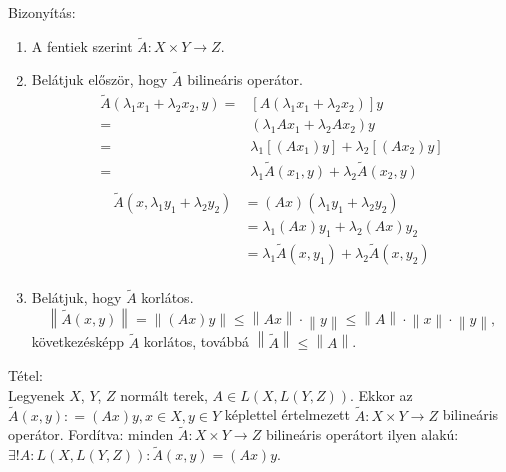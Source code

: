 \documentclass[12pt,a4paper]{scrartcl}
\providecommand{\tightlist}{%
  \setlength{\itemsep}{0pt}\setlength{\parskip}{0pt}}
\newenvironment{tetel}{}{}
\newenvironment{bizonyitas}{}{}
\begin{document}
\begin{bizonyitas}

Bizonyítás:

\begin{enumerate}
\def\labelenumi{\arabic{enumi}.}
\tightlist
\item
  A fentiek szerint
  \(\left. \widetilde{A}:X \times Y\rightarrow Z \right.\).
\item
  Belátjuk először, hogy \(\widetilde{A}\) bilineáris operátor.
  \[\begin{aligned}
    \tilde A\left( {{\lambda _1}{x_1} + {\lambda _2}{x_2},y} \right) =  & \left[ {A\left( {{\lambda _1}{x_1} + {\lambda _2}{x_2}} \right)} \right]y \\ 
     =  & \left( {{\lambda _1}A{x_1} + {\lambda _2}A{x_2}} \right)y \\ 
     =  & {\lambda _1}\left[ {\left( {A{x_1}} \right)y} \right] + {\lambda _2}\left[ {\left( {A{x_2}} \right)y} \right] \\ 
     =  & {\lambda _1}\tilde A\left( {{x_1},y} \right) + {\lambda _2}\tilde A\left( {{x_2},y} \right) \\ 
  \end{aligned} \] \[\begin{aligned}
    \tilde A\left( {x,{\lambda _1}{y_1} + {\lambda _2}{y_2}} \right) &  = \left( {Ax} \right)\left( {{\lambda _1}{y_1} + {\lambda _2}{y_2}} \right) \\ 
     &  = {\lambda _1}\left( {Ax} \right){y_1} + {\lambda _2}\left( {Ax} \right){y_2} \\ 
     &  = {\lambda _1}\tilde A\left( {x,{y_1}} \right) + {\lambda _2}\tilde A\left( {x,{y_2}} \right) \\ 
  \end{aligned} \]
\item
  Belátjuk, hogy \(\widetilde{A}\) korlátos.
  \[\left\| {\tilde A\left( {x,y} \right)} \right\| = \left\| {\left( {Ax} \right)y} \right\| \leqslant \left\| {Ax} \right\| \cdot \left\| y \right\| \leqslant \left\| A \right\| \cdot \left\| x \right\| \cdot \left\| y \right\|,\]
  következésképp \({\tilde A}\) korlátos, továbbá
  \(\left\| \widetilde{A} \right\| \leq \left\| A \right\|\).
\end{enumerate}

\end{bizonyitas}

\begin{tetel}

Tétel:\\
Legyenek \(X\), \(Y\), \(Z\) normált terek,
\(A \in L\left( {X,L\left( {Y,Z} \right)} \right)\). Ekkor az
\(\widetilde{A}\left( {x,y} \right): = \left( {Ax} \right)y,x \in X,y \in Y\)
képlettel értelmezett
\(\left. \widetilde{A}:X \times Y\rightarrow Z \right.\) bilineáris
operátor. Fordítva: minden
\(\left. \widetilde{A}:X \times Y\rightarrow Z \right.\) bilineáris
operátort ilyen alakú:
\(\exists!A:L\left( {X,L\left( {Y,Z} \right)} \right):\widetilde{A}\left( {x,y} \right) = \left( {Ax} \right)y\).

\end{tetel}
\end{document}
